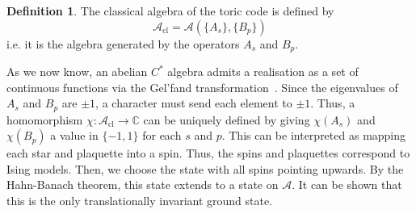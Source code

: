\documentclass[prb,11pt, nofootinbib]{revtex4-2}
\theoremstyle{definition}
\theoremstyle{definition}
\theoremstyle{definition}
\theoremstyle{definition}
\newtheorem{Definition}[Theorem]{Definition}
\newcommand{\C}{\mathbb{C}}
\begin{document}
\begin{Definition}
	The classical algebra of the toric code is defined by
	\[
	\mathcal{A}_\text{cl} = \mathcal{A}(\{A_s\}, \{B_p\} ) 
	\] 
	i.e. it is the algebra generated by the operators $A_s$ and $B_p$.
\end{Definition}
As we now know, an abelian $C^*$ algebra admits a realisation as a set of continuous functions via the Gel'fand transformation~\cite{takesaki1979theory}. Since the eigenvalues of $A_s$ and $B_p$ are $\pm 1$, a character must send each element to $\pm 1$. Thus, a homomorphism $\chi: \mathcal{A}_\text{cl}\to \C$ can be uniquely defined by giving $\chi(A_s)$ and $\chi(B_p)$ a value in $\{-1,1\} $ for each $s$ and $p$. This can be interpreted as mapping each star and plaquette into a spin. Thus, the spins and plaquettes correspond to Ising models. Then, we choose the state with all spins pointing upwards. By the Hahn-Banach theorem, this state extends to a state on $\mathcal{A}$. It can be shown that this is the only translationally invariant ground state.
\end{document}
